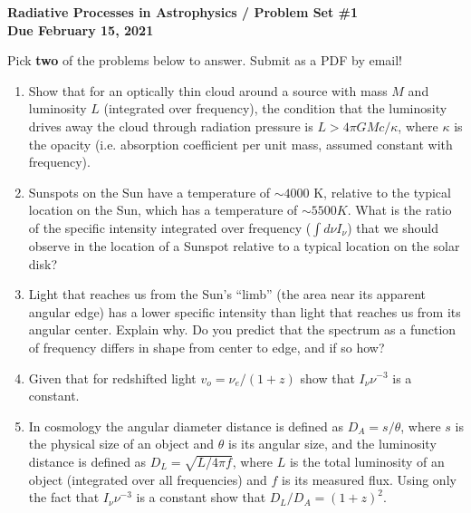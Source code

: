 \documentclass[11pt, preprint]{article}
\begin{document}
\begin{center}
  {\bf Radiative Processes in Astrophysics / Problem Set \#1 \\
    Due February 15, 2021}
\end{center}

\noindent Pick {\bf two} of the problems below to answer. Submit
as a PDF by email!

\begin{enumerate}
\item Show that for an optically thin cloud around a source with mass
  $M$ and luminosity $L$ (integrated over frequency), the condition
  that the luminosity drives away the cloud through radiation pressure
  is $L>4\pi G M c/\kappa$, where $\kappa$ is the opacity
  (i.e. absorption coefficient per unit mass, assumed constant with
  frequency). 
\item Sunspots on the Sun have a temperature of $\sim 4000$ K,
  relative to the typical location on the Sun, which has a temperature
  of $\sim 5500 K$. What is the ratio of the specific intensity
  integrated over frequency ($\int d\nu I_\nu$) that we should observe
  in the location of a Sunspot relative to a typical location on the
  solar disk?
\item Light that reaches us from the Sun's ``limb'' (the area near its
  apparent angular edge) has a lower specific intensity than light
  that reaches us from its angular center. Explain why. Do you predict
  that the spectrum as a function of frequency differs in shape from
  center to edge, and if so how?
\item Given that for redshifted light $v_o = \nu_e / (1+z)$ show that
  $I_\nu \nu^{-3}$ is a constant. 
\item In cosmology the angular diameter distance is defined as $D_A =
  s / \theta$, where $s$ is the physical size of an object and
  $\theta$ is its angular size, and the luminosity distance is defined
  as $D_L = \sqrt{L/4\pi f}$, where $L$ is the total luminosity of an
  object (integrated over all frequencies) and $f$ is its measured
  flux. Using only the fact that $I_\nu \nu^{-3}$ is a constant show
  that $D_L/D_A = (1+z)^2$.
\end{enumerate}
\end{document}
